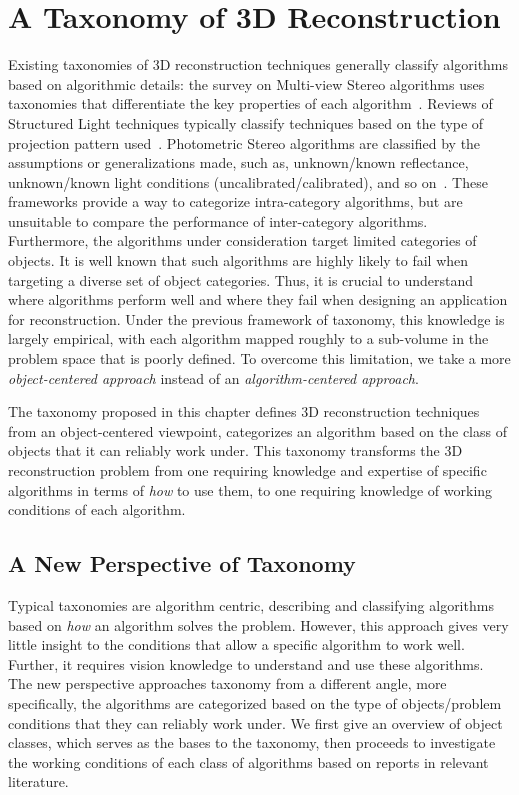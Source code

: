 
\chapter{A Taxonomy of 3D Reconstruction}
\label{ch:3DRecon_Taxo}
Existing taxonomies of 3D reconstruction techniques generally classify algorithms based on algorithmic details: the survey on Multi-view Stereo algorithms uses taxonomies that differentiate the key properties of each algorithm~\cite{seitz2006comparison}. Reviews of Structured Light techniques typically classify techniques based on the type of projection pattern used~\cite{geng2011structured, salvi2004pattern}. Photometric Stereo algorithms are classified by the assumptions or generalizations made, such as, unknown/known reflectance, unknown/known light conditions (uncalibrated/calibrated), and so on~\cite{shi2016benchmark}. These frameworks provide a way to categorize intra-category algorithms, but are unsuitable to compare the performance of inter-category algorithms. Furthermore, the algorithms under consideration target limited categories of objects. It is well known that such algorithms are highly likely to fail when targeting a diverse set of object categories. Thus, it is crucial to understand where algorithms perform well and where they fail when designing an application for reconstruction. Under the previous framework of taxonomy, this knowledge is largely empirical, with each algorithm mapped roughly to a sub-volume in the problem space that is poorly defined. To overcome this limitation, we take a more \textit{object-centered approach} instead of an \textit{algorithm-centered approach}.

The taxonomy proposed in this chapter defines 3D reconstruction techniques from an object-centered viewpoint, \ie categorizes an algorithm based on the class of objects that it can reliably work under. This taxonomy transforms the 3D reconstruction problem from one requiring knowledge and expertise of specific algorithms in terms of \textit{how} to use them, to one requiring knowledge of working conditions of each algorithm.

\section{A New Perspective of Taxonomy}
Typical taxonomies are algorithm centric, describing and classifying algorithms based on \textit{how} an algorithm solves the problem. However, this approach gives very little insight to the conditions that allow a specific algorithm to work well. Further, it requires vision knowledge to understand and use these algorithms. The new perspective approaches taxonomy from a different angle, more specifically, the algorithms are categorized based on the type of objects/problem conditions that they can reliably work under. We first give an overview of object classes, which serves as the bases to the taxonomy, then proceeds to investigate the working conditions of each class of algorithms based on reports in relevant literature.

